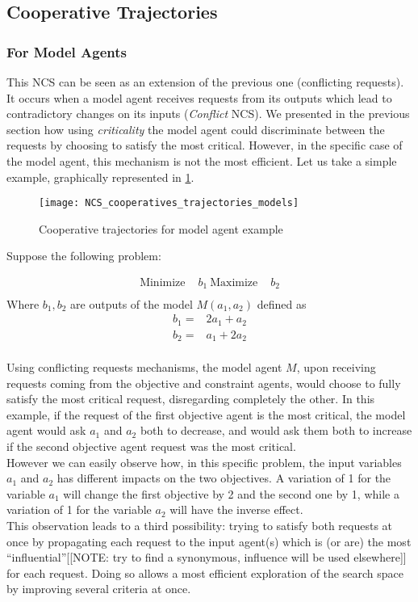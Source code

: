 \subsection{Cooperative Trajectories}

\subsubsection{For Model Agents}

This NCS can be seen as an extension of the previous one (conflicting requests). It occurs when a model agent receives requests from its outputs which lead to contradictory changes on its inputs (\emph{Conflict} NCS). We presented in the previous section how using \emph{criticality} the model agent could discriminate between the requests by choosing to satisfy the most critical. However, in the specific case of the model agent, this mechanism is not the most efficient. Let us take a simple example, graphically represented in \figurename{} \ref{NCS_cooperatives_trajectories_models}.

\begin{figure}
\centering
\texttt{[image: NCS\_cooperatives\_trajectories\_models]}
\caption{Cooperative trajectories for model agent example}\label{NCS_cooperatives_trajectories_models}
\end{figure}


Suppose the following problem:

\begin{align*}
\text{Minimize } &b_1\
\text{Maximize } &b_2\\
\end{align*}
Where $b_1,b_2$ are outputs of the model $M(a_1,a_2)$ defined as
\begin{align*}
b_1 = &2a_1 + a_2\\
b_2 = &a_1 + 2a_2\\
\end{align*}

Using conflicting requests mechanisms, the model agent $M$, upon receiving requests coming from the objective and constraint agents, would choose to fully satisfy the most critical request, disregarding completely the other. In this example, if the request of the first objective agent is the most critical, the model agent would ask $a_1$ and $a_2$ both to decrease, and would ask them both to increase if the second objective agent request was the most critical.\\
However we can easily observe how, in this specific problem, the input variables $a_1$ and $a_2$ has different impacts on the two objectives. A variation of 1 for the variable $a_1$ will change the first objective by 2 and the second one by 1, while a variation of 1 for the variable $a_2$ will have the inverse effect.\\
This observation leads to a third possibility: trying to satisfy both requests at once by propagating each request to the input agent(s) which is (or are) the most \enquote{influential}[[NOTE: try to find a synonymous, influence will be used elsewhere]] for each request. Doing so allows a most efficient exploration of the search space by improving several criteria at once.

